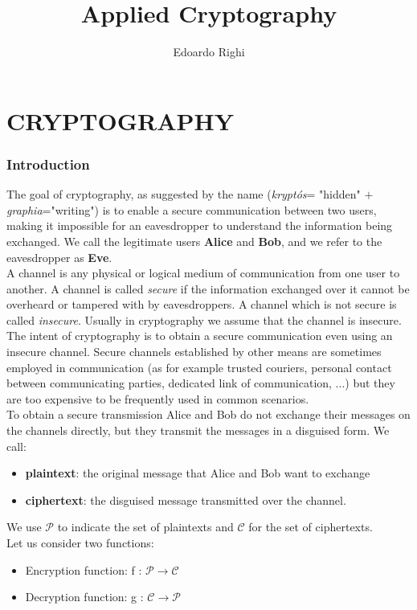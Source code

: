 \documentclass[a4paper, 10pt, titlepage]{article}
\begin{document}
	\title{Applied Cryptography}
	\author{Edoardo Righi}
	\maketitle

	\thispagestyle{empty}
	\part{CRYPTOGRAPHY}
	\newpage
	\section{Introduction}
	The goal of cryptography, as suggested by the name (\textit{kryptós}= "hidden" $+$ \textit{graphia}="writing") is to enable a secure communication between two users, making it impossible for an eavesdropper to understand the information being exchanged. We call the legitimate users \textbf{Alice} and \textbf{Bob}, and we refer to the eavesdropper as \textbf{Eve}. \\
	A channel is any physical or logical medium of communication from one user to another. A channel is called \textit{secure} if the information exchanged over it cannot be overheard or tampered with by eavesdroppers. A channel which is not secure is called \textit{insecure}. Usually in cryptography we assume that the channel is insecure. The intent of cryptography is to obtain a secure communication even using an insecure channel. Secure channels established by other means are sometimes employed in communication (as for example trusted couriers, personal contact between communicating parties, dedicated link of communication, ...) but they are too expensive to be frequently used in common scenarios. \\
	To obtain a secure transmission Alice and Bob do not exchange their messages on the channels directly, but they transmit the messages in a disguised form. We call:
	\begin{itemize}
	\item \textbf{plaintext}: the original message that Alice and Bob want to
exchange
\item \textbf{ciphertext}: the disguised message transmitted over the channel.
	\end{itemize}
We use $\mathcal{P}$ to indicate the set of plaintexts and $\mathcal{C}$ for the set of ciphertexts. \medskip \\
Let us consider two functions:
\begin{itemize}
\item Encryption function: f : $\mathcal{P} \rightarrow \mathcal{C}$
\item Decryption function: g : $\mathcal{C} \rightarrow \mathcal{P}$
\end{itemize}
\end{document}
